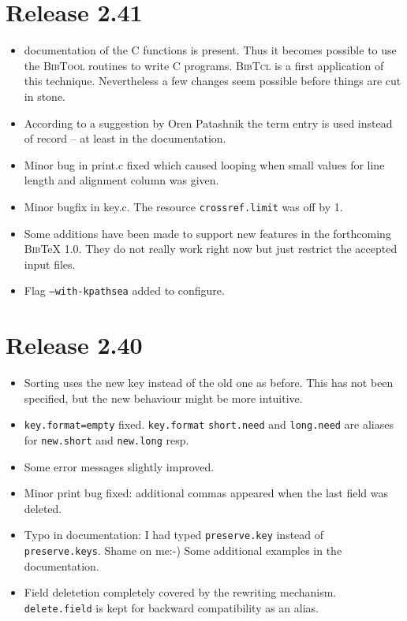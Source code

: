 \documentclass[11pt,a4paper]{scrartcl}
\newcommand\rsc[1]{\texttt{#1}}
\newcommand\File[1]{\textsf{#1}}
\newcommand\BibTool{\textsc{BibTool}}
\newcommand\BibTcl{\textsc{BibTcl}}
\newcommand\BibTeX{\textsc{Bib}\TeX}
\newenvironment{Release}[2]{\section*{Release #1}\begin{itemize}}{\end{itemize}}
\newenvironment{Fix}[1]{\item }{}
\newenvironment{New}[1]{\item }{}
\newenvironment{Doc}[1]{\item }{}
\newenvironment{Update}[1]{\item }{}
\begin{document}
\begin{Release}{2.41}{}
\begin{Doc}{gene}
    documentation of the C functions is present. Thus it becomes possible to
    use the \BibTool{} routines to write C programs. \BibTcl{} is a first
    application of this technique. Nevertheless a few changes seem possible
    before things are cut in stone.
  \end{Doc}
  \begin{Doc}{gene}
    According to a suggestion by Oren Patashnik the term entry is used instead
    of record -- at least in the documentation.
  \end{Doc}
  \begin{Fix}{gene}
    Minor bug in \File{print.c} fixed which caused looping when small values
    for line length and alignment column was given.
  \end{Fix}
  \begin{Fix}{gene}
    Minor bugfix in \File{key.c}. The resource \rsc{crossref.limit} was
    off by 1.
  \end{Fix}
  \begin{New}{gene}
    Some additions have been made to support new features in the forthcoming
    \BibTeX{} 1.0. They do not really work right now but just restrict the
    accepted input files.
  \end{New}
  \begin{New}{gene}
    Flag \texttt{--with-kpathsea} added to configure.
  \end{New}
 \end{Release}

 \begin{Release}{2.40}{}
  \begin{New}{gene}
    Sorting uses the new key instead of the old one as before. This has not
    been specified, but the new behaviour might be more intuitive.
  \end{New}
  \begin{Fix}{gene}
    \rsc{key.format=empty} fixed. \rsc{key.format} \rsc{short.need}
    and \rsc{long.need} are aliases for \rsc{new.short} and
    \rsc{new.long} resp.
  \end{Fix}
  \begin{Update}{gene}
    Some error messages slightly improved.
  \end{Update}
  \begin{Fix}{gene}
    Minor print bug fixed: additional commas appeared when the last field was
    deleted.
  \end{Fix}
  \begin{Doc}{gene}
    Typo in documentation: I had typed \rsc{preserve.key} instead of
    \rsc{preserve.keys}. Shame on me:-) Some additional examples in the
    documentation.
  \end{Doc}
  \begin{Update}{gene}
    Field deletetion completely covered by the rewriting mechanism.
    \rsc{delete.field} is kept for backward compatibility as an alias.
  \end{Update}
 \end{Release}
\end{document}
